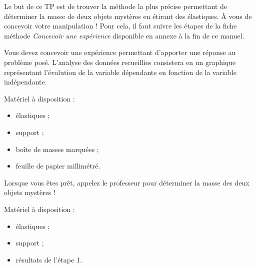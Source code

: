 \begin{TP}



\begin{cadre}

Le but de ce TP est de trouver la méthode la plus précise permettant de déterminer la masse de deux objets mystères en étirant des élastiques. À vous de concevoir votre manipulation ! Pour cela, il faut suivre les étapes de la fiche méthode \emph{\og Concevoir une expérience \fg} disponible en annexe à la fin de ce manuel.

\end{cadre}

\vspace{1em}



\begin{partie}

Vous devez concevoir une expérience permettant d'apporter une réponse au problème posé. L'analyse des données recueillies consistera en un graphique représentant l'évolution de la variable dépendante en fonction de la variable indépendante.

Matériel à disposition :
\begin{itemize}
\item élastiques ;
\item support ;
\item boîte de masses marquées ;
\item feuille de papier millimétré.
\end{itemize}

\end{partie}

\vspace{1em}

\begin{partie}

Lorsque vous êtes prêt, appelez le professeur pour déterminer la masse des deux objets mystères !

Matériel à disposition :
\begin{itemize}
\item élastiques ;
\item support ;
\item résultats de l'étape 1.
\end{itemize}

\end{partie}


\end{TP}
